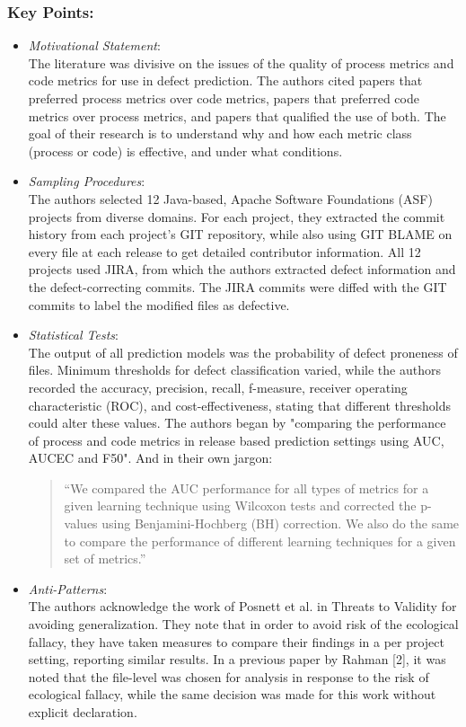 \documentclass{sig-alternate-05-2015}
\begin{document}
\subsubsection{Key Points:}
\begin{itemize}
\item \emph{ Motivational Statement}: \\
The literature was divisive on the issues of the quality of process metrics and code metrics for use in defect prediction. The authors cited papers that preferred process metrics over code metrics, papers that preferred code metrics over process metrics, and papers that qualified the use of both. The goal of their research is to understand why and how each metric class (process or code) is effective, and under what conditions.
\item \emph{Sampling Procedures}: \\
The authors selected 12 Java-based, Apache Software Foundations (ASF) projects from diverse domains. For each project, they extracted the commit history from each project's GIT repository, while also using GIT BLAME on every file at each release to get detailed contributor information. All 12 projects used JIRA, from which the authors extracted defect information and the defect-correcting commits. The JIRA commits were diffed with the GIT commits to label the modified files as defective.
\item \emph{Statistical Tests}: \\
The output of all prediction models was the probability of defect proneness of files. Minimum thresholds for defect classification varied, while the authors recorded the accuracy, precision, recall, f-measure, receiver operating characteristic (ROC), and cost-effectiveness, stating that different thresholds could alter these values. The authors began by "comparing the performance of process and code metrics in release based prediction settings using AUC, AUCEC and F50". And in their own jargon:
\blockquote{\enquote{We compared the AUC performance for all types of metrics for a given learning technique using Wilcoxon tests and corrected the p-values using Benjamini-Hochberg (BH) correction. We also do the same to compare the performance of different learning techniques for a given set of metrics.}}
\item \emph{ Anti-Patterns}: \\
The authors acknowledge the work of Posnett et al. in Threats to Validity for avoiding generalization. They note that in order to avoid risk of the ecological fallacy, they have taken measures to compare their findings in a per project setting, reporting similar results. In a previous paper by Rahman [2], it was noted that the file-level was chosen for analysis in response to the risk of ecological fallacy, while the same decision was made for this work without explicit declaration.
\end{itemize}
\end{document}
